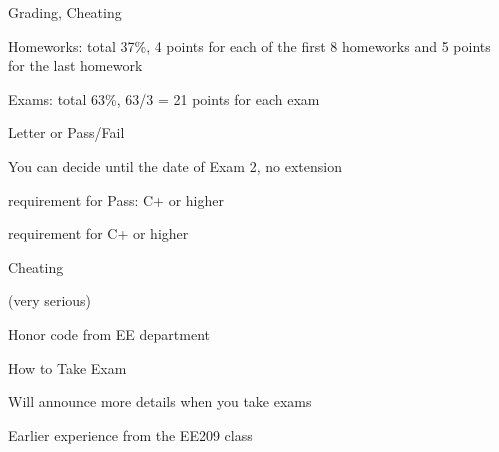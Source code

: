 \begin{frame}{Grading, Cheating}

\plitemsep 0.03in

  \bci 

\item Homeworks: total 37\%, 4 points for each of the first 8 homeworks
  and 5 points for the last homework 

\item Exams: total 63\%, 63/3 = 21 points for each exam 
  \bci
  \item {}
  \eci
\item Letter or Pass/Fail
  \bci
\item You can decide until the date of Exam 2, no extension
\item {} requirement for Pass: C+ or higher
\item {} requirement for C+ or higher
  \bci
  \item {}
  \eci
  \eci

\item Cheating
  \bci
\item {\bf {}} (very serious)
  \item Honor code from EE department

  \eci
  
  \eci

\end{frame}

\begin{frame}{How to Take Exam}


\plitemsep 0.02in

\bci 

\item Will announce more details when you take exams
  
\item Earlier experience from the EE209 class

  \eci
\vspace{-0.4cm}
\end{frame}



